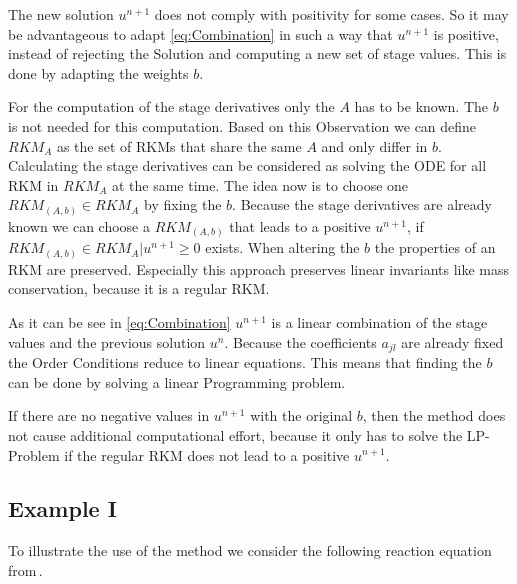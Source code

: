 \documentclass{article}
\begin{document}
The new solution $u^{n+1}$ does not comply with positivity for some cases. 
So it may be advantageous to adapt \eqref{eq:Combination} in such a way that $u^{n+1}$ is positive, instead of rejecting the Solution and computing a new set of stage values. This is done by adapting the weights $b$.




For the computation of the stage derivatives only the $A$ has to be known. The $b$ is not needed for this computation. 
Based on this Observation we can define $RKM_{A}$ as the set of RKMs that share the same $A$ and only differ in $b$.
Calculating the stage derivatives can be considered as solving the ODE for all RKM in $RKM_A$ at the same time.
The idea now is to choose one $RKM_{(A,b)} \in RKM_{A}$ by fixing the $b$. 
Because the stage derivatives are already known we can choose a $RKM_{(A,b)}$ that leads to a positive $u^{n+1}$, if $RKM_{(A,b)} \in RKM_{A} | u^{n+1} \geq 0$ exists.
When altering the $b$ the properties of an RKM are preserved. 
Especially this approach preserves linear invariants like mass conservation, because it is a regular RKM. 

As it can be see in \eqref{eq:Combination} $u^{n+1}$ is a linear combination of the stage values and the previous solution $u^n$.
Because the coefficients $a_{jl}$ are already fixed the Order Conditions reduce to linear equations.
This means that finding the $b$ can be done by solving a linear Programming problem.
 
If there are no negative values in $u^{n+1}$ with the original $b$, then the method does not cause additional computational effort, because it only has to solve the LP-Problem if the regular RKM does not lead to a positive $u^{n+1}$. %



\subsection{Example I}\label{sec:example_reac}

To illustrate the use of the method we consider the following reaction equation from\,\cite{kopecz_comparison_2019}.
\end{document}
